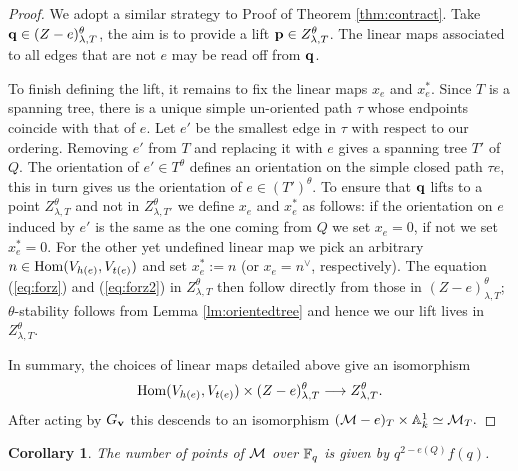 \documentclass{amsart}
\newtheorem{cor}[thm]{Corollary}
\theoremstyle{definition}
\begin{document}
\begin{proof}
We adopt a similar strategy to Proof of Theorem \ref{thm:contract}.
Take $\mathbf{q} \in (Z-e)_{\lambda,T}^\theta$, the aim is to provide a lift $\mathbf{p} \in Z_{\lambda,T}^\theta$.
The linear maps associated to all edges that are not $e$ may be read off from $\mathbf{q}$.

To finish defining the lift, it remains to fix the linear maps $x_e$ and $x_e^*$.
Since $T$ is a spanning tree, there is a unique simple un-oriented path $\tau$ whose endpoints coincide with that of $e$.
Let $e'$ be the smallest edge in $\tau$ with respect to our ordering.
Removing $e'$ from $T$ and replacing it with $e$ gives a spanning tree $T'$ of $Q$.
The orientation of $e' \in T^\theta$ defines an orientation on the simple closed path $\tau e$, this in turn gives us the orientation of $e \in (T')^\theta$.
To ensure that $\mathbf{q}$ lifts to a point $Z_{\lambda,T}^\theta$ and not in $Z_{\lambda,T'}^\theta$ we define $x_e$ and $x_e^*$ as follows: if the orientation on $e$ induced by $e'$ is the same as the one coming from $Q$ we set $x_e=0$, if not we set $x_e^*=0$.
For the other yet undefined linear map we pick an arbitrary $n \in \operatorname{Hom}(V_{h(e)}, V_{t(e)})$ and set $x_e^*:=n$ (or $x_e=n^\vee$, respectively).
The equation (\ref{eq:forz}) and (\ref{eq:forz2}) in $Z_{\lambda,T}^\theta$ then follow directly from those in $(Z-e)_{\lambda,T}^\theta$; $\theta$-stability follows from Lemma \ref{lm:orientedtree} and hence we our lift lives in $Z_{\lambda,T}^\theta$.

In summary, the choices of linear maps detailed above give an isomorphism $$\operatorname{Hom}(V_{h(e)}, V_{t(e)}) \times (Z-e)_{\lambda,T}^\theta \longrightarrow Z_{\lambda,T}^\theta.$$
After acting by $G_{\mathbf{v}}$ this descends to an isomorphism $(\mathcal{M}-e)_T \times \mathbb{A}_k^1 \simeq \mathcal{M}_T.$
\end{proof}

\begin{cor}\label{cor:pointsM}
The number of points of $\mathcal{M}$ over $\mathbb{F}_q$ is given by $q^{2-e(Q)} f(q)$.
\end{cor}
\end{document}
